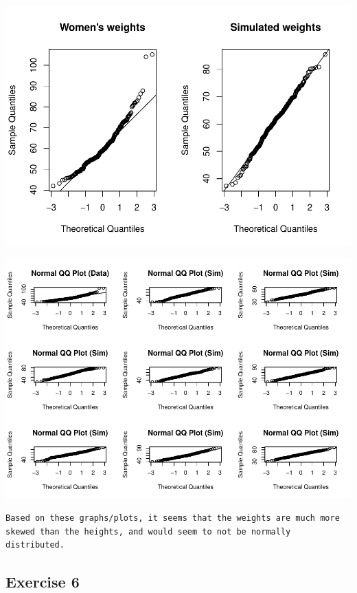 \documentclass[]{article}
\newenvironment{Shaded}{\begin{snugshade}}{\end{snugshade}}
\newcommand{\KeywordTok}[1]{\textcolor[rgb]{0.13,0.29,0.53}{\textbf{{#1}}}}
\newcommand{\NormalTok}[1]{{#1}}
\begin{document}
\includegraphics{Lab_3_files/figure-latex/unnamed-chunk-4-2.pdf}

\begin{Shaded}
\end{Shaded}

\includegraphics{Lab_3_files/figure-latex/unnamed-chunk-4-3.pdf}

\begin{verbatim}
Based on these graphs/plots, it seems that the weights are much more skewed than the heights, and would seem to not be normally distributed.
\end{verbatim}

\subsection{Exercise 6}\label{exercise-6}
\end{document}
